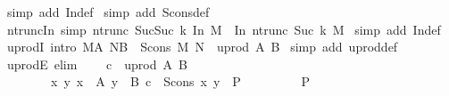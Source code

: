 \begin{isabellebody}
%
\endisadelimproof
%
\isatagproof
{}\isamarkupfalse%
\ {\isacharparenleft}simp\ add{\isacharcolon}\ In{}{\isacharunderscore}def{\isacharparenright}\isanewline
{}\isamarkupfalse%
\ {\isacharparenleft}simp\ add{\isacharcolon}\ Scons{\isacharunderscore}def{\isacharparenright}\isanewline
{}\isamarkupfalse%
%
\endisatagproof
{\isafoldproof}%
%
\isadelimproof
\isanewline
%
\endisadelimproof
\isanewline
{}\isamarkupfalse%
\ ntrunc{\isacharunderscore}In{}\ {\isacharbrackleft}simp{\isacharbrackright}{\isacharcolon}\ {\isachardoublequoteopen}ntrunc\ {\isacharparenleft}Suc{\isacharparenleft}Suc\ k{\isacharparenright}{\isacharparenright}\ {\isacharparenleft}In{}\ M{\isacharparenright}\ {\isacharequal}\ In{}\ {\isacharparenleft}ntrunc\ {\isacharparenleft}Suc\ k{\isacharparenright}\ M{\isacharparenright}{\isachardoublequoteclose}\isanewline
%
\isadelimproof
%
\endisadelimproof
%
\isatagproof
{}\isamarkupfalse%
\ {\isacharparenleft}simp\ add{\isacharcolon}\ In{}{\isacharunderscore}def{\isacharparenright}%
\endisatagproof
{\isafoldproof}%
%
\isadelimproof
%
\endisadelimproof
%
\isadelimdocument
%
\endisadelimdocument
%
\isatagdocument
%
\isamarkuptrue%
%
\endisatagdocument
{\isafolddocument}%
%
\isadelimdocument
%
\endisadelimdocument
{}\isamarkupfalse%
\ uprodI\ {\isacharbrackleft}intro{\isacharbang}{\isacharbrackright}{\isacharcolon}\ {\isachardoublequoteopen}{\isasymlbrakk}M{\isasymin}A{\isacharsemicolon}\ N{\isasymin}B{\isasymrbrakk}\ {\isasymLongrightarrow}\ Scons\ M\ N\ {\isasymin}\ uprod\ A\ B{\isachardoublequoteclose}\isanewline
%
\isadelimproof
%
\endisadelimproof
%
\isatagproof
{}\isamarkupfalse%
\ {\isacharparenleft}simp\ add{\isacharcolon}\ uprod{\isacharunderscore}def{\isacharparenright}%
\endisatagproof
{\isafoldproof}%
%
\isadelimproof
\isanewline
%
\endisadelimproof
\isanewline
\isanewline
{}\isamarkupfalse%
\ uprodE\ {\isacharbrackleft}elim{\isacharbang}{\isacharbrackright}{\isacharcolon}\isanewline
\ \ \ \ {\isachardoublequoteopen}{\isasymlbrakk}c\ {\isasymin}\ uprod\ A\ B{\isacharsemicolon}\ \ \ \isanewline
\ \ \ \ \ \ \ \ {\isasymAnd}x\ y{\isachardot}\ {\isasymlbrakk}x\ {\isasymin}\ A{\isacharsemicolon}\ y\ {\isasymin}\ B{\isacharsemicolon}\ c\ {\isacharequal}\ Scons\ x\ y{\isasymrbrakk}\ {\isasymLongrightarrow}\ P\ \ \isanewline
\ \ \ \ \ {\isasymrbrakk}\ {\isasymLongrightarrow}\ P{\isachardoublequoteclose}\isanewline
%
\isadelimproof

\end{isabellebody}
